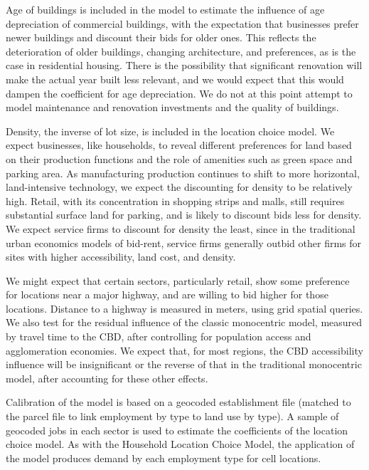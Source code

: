 Age of buildings is included in the model to estimate the
influence of age depreciation of commercial buildings, with the
expectation that businesses prefer newer buildings and discount
their bids for older ones.  This reflects the deterioration of
older buildings, changing architecture, and preferences, as is the
case in residential housing.  There is the possibility that
significant renovation will make the actual year built less
relevant, and we would expect that this would dampen the
coefficient for age depreciation.  We do not at this point attempt
to model maintenance and renovation investments and the quality of
buildings.

Density, the inverse of lot size, is included in the location
choice model.  We expect businesses, like households, to reveal
different preferences for land based on their production functions
and the role of amenities such as green space and parking area. As
manufacturing production continues to shift to more horizontal,
land-intensive technology, we expect the discounting for density
to be relatively high.  Retail, with its concentration in shopping
strips and malls, still requires substantial surface land for
parking, and is likely to discount bids less for density.  We
expect service firms to discount for density the least, since in
the traditional urban economics models of bid-rent, service firms
generally outbid other firms for sites with higher accessibility,
land cost, and density.

We might expect that certain sectors, particularly retail, show
some preference for locations near a major highway, and are
willing to bid higher for those locations.  Distance to a highway
is measured in meters, using grid spatial queries.  We also test
for the residual influence of the classic monocentric model,
measured by travel time to the CBD, after controlling for
population access and agglomeration economies.  We expect that,
for most regions, the CBD accessibility influence will be
insignificant or the reverse of that in the traditional
monocentric model, after accounting for these other effects.

Calibration of the model is based on a geocoded establishment file
(matched to the parcel file to link employment by type to land use
by type).  A sample of geocoded jobs in each sector is used to
estimate the coefficients of the location choice model.  As with
the Household Location Choice Model, the application of the model
produces demand by each employment type for cell locations.

